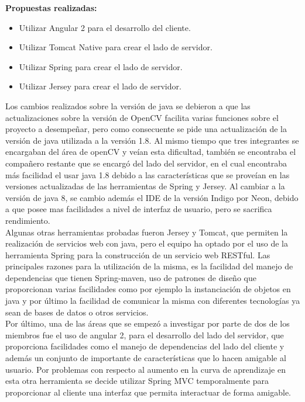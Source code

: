 \documentclass{report}
\begin{document}
\textbf{Propuestas realizadas:}
\begin{itemize} 
\item Utilizar Angular 2 para el desarrollo del cliente. 
\item Utilizar Tomcat Native para crear el lado de servidor. 
\item Utilizar Spring para crear el lado de servidor. 
\item Utilizar Jersey para crear el lado de servidor. \\
\end{itemize}

Los cambios realizados sobre la versi\'on de java se debieron a que las actualizaciones sobre la versi\'on de OpenCV facilita varias funciones sobre el proyecto a desempeñar, pero como consecuente se pide una actualizaci\'on de la versi\'on de java utilizada a la versi\'on 1.8. Al mismo tiempo que tres integrantes se encargaban del \'area de openCV y ve\'ian esta dificultad, tambi\'en se encontraba el compañero restante que se encarg\'o del lado del servidor, en el cual encontraba m\'as facilidad el usar java 1.8 debido a las caracter\'isticas que se prove\'ian en las versiones actualizadas de las herramientas de Spring y Jersey. Al cambiar a la versi\'on de java 8, se cambio adem\'as el IDE de la versi\'on Indigo por Neon, debido a que posee mas facilidades a nivel de interfaz de usuario, pero se sacrifica rendimiento.\\

Algunas otras herramientas probadas fueron Jersey y Tomcat, que permiten la realizaci\'on de servicios web con java, pero el equipo ha optado por el uso de la herramienta Spring para la construcci\'on de un servicio web RESTful. Las principales razones para la utilizaci\'on de la misma, es la facilidad del manejo de dependencias que tienen Spring-maven, uso de patrones de dise\~no que proporcionan varias facilidades como por ejemplo la instanciaci\'on de objetos en java y por \'ultimo la facilidad de comunicar la misma con diferentes tecnolog\'ias ya sean de bases de datos o otros servicios. \\

Por \'ultimo, una de las \'areas que se empez\'o a investigar por parte de dos de los miembros fue el uso de angular 2, para el desarrollo del lado del servidor, que proporciona facilidades como el manejo de dependencias del lado del cliente y adem\'as un conjunto de importante de caracter\'isticas que lo hacen amigable al usuario. Por problemas con respecto al aumento en la curva de aprendizaje en esta otra herramienta se decide utilizar Spring MVC temporalmente para proporcionar al cliente una interfaz que permita interactuar de forma amigable. \\
\end{document}
